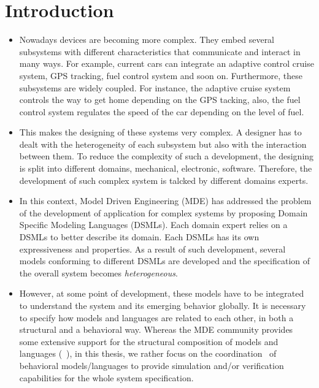 \chapter{Introduction}


\begin{itemize}
	\item Nowadays devices are becoming more complex. They embed several subsystems with different characteristics that communicate and interact in many ways. For example, current cars can integrate an adaptive control cruise system, GPS tracking, fuel control system and soon on. Furthermore, these subsystems are widely coupled. For instance, the adaptive cruise system controls the way to get home depending on the GPS tacking, also, the fuel control system regulates the speed of the car depending on the level of fuel.
	
	\item This makes the designing of these systems very complex. A designer has to dealt with the heterogeneity of each subsystem but also with the interaction between them. To reduce the complexity of such a development, the designing is split into different domains, \eg mechanical, electronic, software. Therefore, the development of such complex system is talcked by different domains experts.
	
	\item In this context, Model Driven Engineering (MDE) has addressed the problem of the development of application for complex systems by proposing Domain Specific Modeling Languages (DSMLs). Each domain expert relies on a DSMLs to better describe its domain. Each DSMLs has its own expressiveness and properties. As a result of such development, several models conforming to different DSMLs are developed and the specification of the overall system becomes \emph{heterogeneous}.
	\item However, at some point of development, these models have to be integrated to understand the system and its emerging behavior globally. It is necessary to specify how models and languages are related to each other, in both a structural and a behavioral way. Whereas the MDE community provides some extensive support for the structural composition of models and languages (\eg~\cite{kompose,epsilon}), in this thesis, we rather focus on the coordination~\cite{coordsignibib} of behavioral models/languages to provide simulation and/or verification capabilities for the whole system specification. 
	

\end{itemize}
